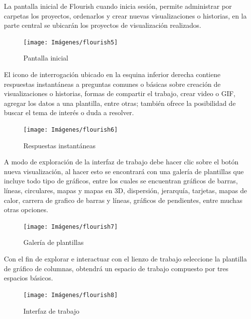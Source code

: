 \documentclass[
]{book}
\begin{document}
La pantalla inicial de Flourish cuando inicia sesión, permite administrar por carpetas los proyectos, ordenarlos y crear nuevas visualizaciones o historias, en la parte central se ubicarán los proyectos de visualización realizados.

\begin{figure}

{\centering \texttt{[image: Imágenes/flourish5]} 

}

\caption{Pantalla inicial}\label{fig:pantallainicialflourish-fig}
\end{figure}

El icono de interrogación ubicado en la esquina inferior derecha contiene respuestas instantáneas a preguntas comunes o básicas sobre creación de visualizaciones o historias, formas de compartir el trabajo, crear video o GIF, agregar los datos a una plantilla, entre otras; también ofrece la posibilidad de buscar el tema de interés o duda a resolver.

\begin{figure}

{\centering \texttt{[image: Imágenes/flourish6]} 

}

\caption{Respuestas instantáneas}\label{fig:respuestasinstantaneas-fig}
\end{figure}

A modo de exploración de la interfaz de trabajo debe hacer clic sobre el botón nueva visualización, al hacer esto se encontrará con una galería de plantillas que incluye todo tipo de gráficos, entre los cuales se encuentran gráficos de barras, líneas, circulares, mapas y mapas en 3D, dispersión, jerarquía, tarjetas, mapas de calor, carrera de grafico de barras y líneas, gráficos de pendientes, entre muchas otras opciones.

\begin{figure}

{\centering \texttt{[image: Imágenes/flourish7]} 

}

\caption{Galería de plantillas}\label{fig:galeriadeplantillas-fig}
\end{figure}

Con el fin de explorar e interactuar con el lienzo de trabajo seleccione la plantilla de gráfico de columnas, obtendrá un espacio de trabajo compuesto por tres espacios básicos.

\begin{figure}

{\centering \texttt{[image: Imágenes/flourish8]} 

}

\caption{Interfaz de trabajo}\label{fig:interfazdetrabajoflourish-fig}
\end{figure}
\end{document}
